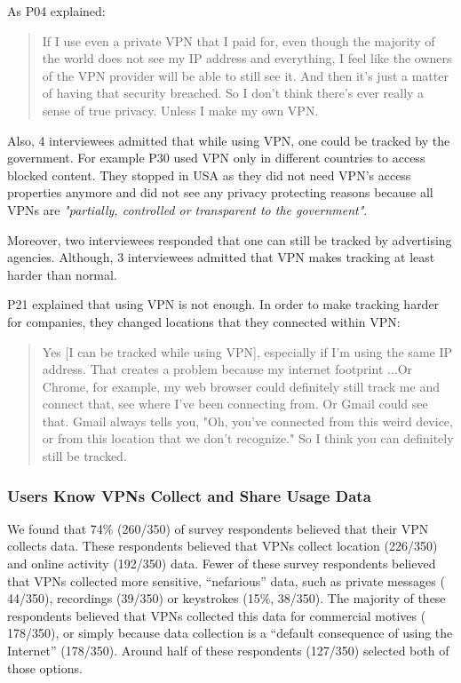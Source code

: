 As P04 explained: \begin{quote}If I use even a private VPN that I paid for, even
though the majority of the world does not see my IP address and everything, I
feel like the owners of the VPN provider will be able to still see it. And
then it's just a matter of having that security breached. So I don't think
there's ever really a sense of true privacy. Unless I make my own
VPN.\end{quote}



Also, 4 interviewees admitted that while using VPN, one could be tracked by
the government. For example P30 used VPN only in different countries to access
blocked content. They stopped in USA as they did not need VPN's access
properties anymore and did not see any privacy protecting reasons because all VPNs are \textit{"partially, controlled
or transparent to the government"}.

Moreover, two interviewees responded that one can still be tracked by
 advertising agencies. Although, 3 interviewees admitted that VPN makes
 tracking at least harder than normal. 

P21 explained that using VPN is not enough. In order to make tracking harder
for companies, they changed locations that they connected within VPN:
\begin{quote}Yes [I can be tracked while using VPN], especially if I'm using
the same IP address. That creates a problem because my internet footprint ...Or Chrome, for example, my web browser could definitely still track me
and connect that, see where I've been connecting from. Or Gmail could see
that. Gmail always tells you, "Oh, you've connected from this weird device, or
from this location that we don't recognize." So I think you can definitely
still be tracked.\end{quote}

\subsubsection{Users Know VPNs Collect and Share Usage Data}

We found that 74\% (260/350) of survey respondents believed that their VPN
collects data. These respondents believed that VPNs collect
location (226/350) and online activity (192/350) data. Fewer of these survey
respondents believed that VPNs collected more sensitive, “nefarious” data,
such as private messages ( 44/350), recordings (39/350) or
keystrokes (15\%, 38/350). The majority of these respondents believed that
VPNs collected this data for commercial motives ( 178/350), or simply
because data collection is a “default consequence of using the Internet”
(178/350). Around half of these respondents (127/350) selected
both of those options.

